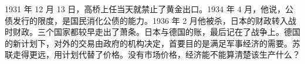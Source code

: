 1931 年 12 月 13 日，高桥上任当天就禁止了黄金出口\cite{shizume2009}。1934 年 4 月，他说，公债发行的限度，是国民消化公债的能力\cite{boj1984}。1936 年 2 月他被杀，日本的财政转入战时财政\cite{ide2003}。三个国家都较早走出了萧条。日本与德国的账，最后记在了战争上。德国的新计划下，对外的交易由政府的机构决定，首要目的是满足军事经济的需要\cite{nca1946b}。苏联走得更远，用计划代替了价格。没有市场价格，经济能不能算清楚该生产什么？
